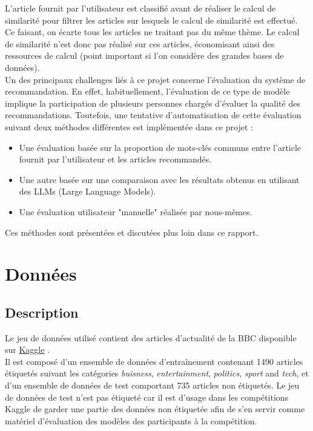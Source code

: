 \documentclass[a4paper,12pt]{article}
\begin{document}
L'article fournit par l'utilisateur est classifié avant de réaliser le calcul de similarité pour filtrer les articles sur lesquels le calcul de similarité est effectué. Ce faisant, on écarte tous les articles ne traitant pas du même thème. Le calcul de similarité n'est donc pas réalisé sur ces articles, économisant ainsi des ressources de calcul (point important si l'on considère des grandes bases de données).\\

Un des principaux challenges liés à ce projet concerne l'évaluation du système de recommandation. En effet, habituellement, l'évaluation de ce type de modèle implique la participation de plusieurs personnes chargés d'évaluer la qualité des recommandations. Toutefois, une tentative d'automatisation de cette évaluation suivant deux méthodes différentes est implémentée dans ce projet : 
\begin{itemize}
    \item Une évaluation basée sur la proportion de mots-clés communs entre l'article fournit par l'utilisateur et les articles recommandés.
    \item Une autre basée sur une comparaison avec les résultats obtenus en utilisant des LLMs (Large Language Models).
    \item Une évaluation utilisateur "manuelle" réalisée par nous-mêmes.
\end{itemize}

Ces méthodes sont présentées et discutées plus loin dans ce rapport.

\section{Données}

\subsection{Description}

Le jeu de données utilisé contient des articles d'actualité de la BBC disponible sur \href{ https://www.kaggle.com/c/learn-ai-bbc}{Kaggle} \cite{kaggle}.\\

Il est composé d'un ensemble de données d'entraînement contenant 1490 articles étiquetés suivant les catégories \textit{buisness}, \textit{entertainment}, \textit{politics}, \textit{sport} and \textit{tech}, et d'un ensemble de données de test comportant 735 articles non étiquetés. Le jeu de données de test n'est pas étiqueté car il est d'usage dans les compétitions Kaggle de garder une partie des données non étiquetée afin de s'en servir comme matériel d'évaluation des modèles des participants à la compétition.\\
\end{document}
